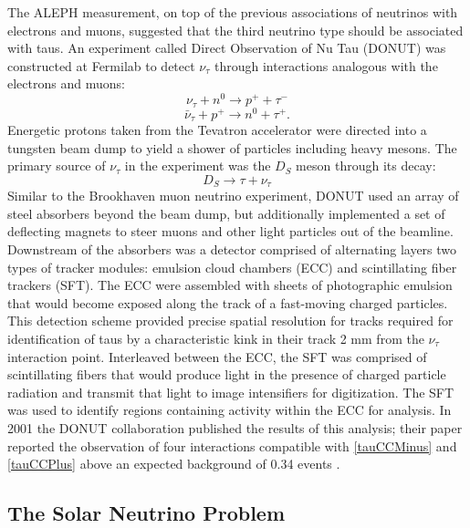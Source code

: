 The ALEPH measurement, on top of the previous associations of neutrinos with
electrons and muons, suggested that the third neutrino type should be
associated with taus.
An experiment called Direct Observation of Nu Tau (DONUT) was constructed at
Fermilab to detect $\nu_\tau$ through interactions analogous with the electrons
and muons:
\begin{equation} \label{tauCCMinus}\nu_\tau + n^0 \rightarrow  p^+ + \tau^- \end{equation}
\begin{equation} \label{tauCCPlus}\bar{\nu}_\tau + p^+ \rightarrow n^0 + \tau^+ . \end{equation}
Energetic protons taken from the Tevatron accelerator were directed into a
tungsten beam dump to yield a shower of particles including heavy mesons.  The
primary source of $\nu_\tau$ in the experiment was the $D_S$ meson through its
decay:
\begin{equation}\label{nuTauDS}
D_S \rightarrow \tau + \nu_\tau
\end{equation}
Similar to the Brookhaven muon neutrino experiment, DONUT used an array of
steel absorbers beyond the beam dump, but additionally implemented a set of
deflecting magnets to steer muons and other light particles out of the
beamline.  Downstream of the absorbers was a detector comprised of alternating
layers two types of tracker modules: emulsion cloud chambers (ECC) and
scintillating fiber trackers (SFT).  The ECC were assembled with sheets of
photographic emulsion that would become exposed along the track of a
fast-moving charged particles.  This detection scheme provided precise spatial
resolution for tracks required for identification of taus by a characteristic
kink in their track 2 mm from the $\nu_\tau$ interaction point.  Interleaved
between the ECC, the SFT was comprised of scintillating fibers that would
produce light in the presence of charged particle radiation and transmit that
light to image intensifiers for digitization.  The SFT was used to identify
regions containing activity within the ECC for analysis.  In 2001 the DONUT
collaboration published the results of this analysis; their paper reported the
observation of four interactions compatible with \eqref{tauCCMinus} and
\eqref{tauCCPlus} above an expected background of 0.34 events  \cite{nuTau}.

\subsection{The Solar Neutrino Problem}


